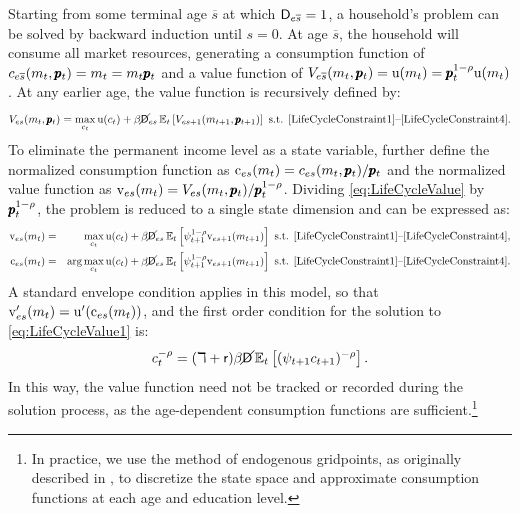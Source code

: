 \documentclass[12pt,titlepage]{econtex}
\begin{document}
Starting from some terminal age $\overline{s}$ at which $\mathsf{D}_{e\overline{s}} = 1$, a household's problem can be solved by backward induction until $s = 0$.  At age $\overline{s}$, the household will consume all market resources, generating a consumption function of $c_{e\overline{s}}(m_t,\pmb{p}_t) = m_t = m_t \pmb{p}_t$ and a value function of $V_{e\overline{s}}(m_t,\pmb{p}_t) = {\mathrm{u}}(m_t) = \pmb{p}_t^{1-\rho} {\mathrm{u}}(m_t)$.  At any earlier age, the value function is recursively defined by:
\begin{equation}
\label{eq:LifeCycleValue}
V_{es}(m_t,\pmb{p}_t) = \max_{c_t} {\mathrm{u}}(c_t) + \beta \cancel{\mathsf{D}}_{es} \operatorname{\mathbb{E}}_t \left[ V_{es+1}(m_{t+1},\pmb{p}_{t+1})\right] \text{ s.t. \eqref{LifeCycleConstraint1}--\eqref{LifeCycleConstraint4}}.
\end{equation}
To eliminate the permanent income level as a state variable, further define the normalized consumption function as $\mathrm{c}_{es}(m_t) = c_{es}(m_t,\pmb{p}_t)/\pmb{p}_t$ and the normalized value function as $\mathrm{v}_{es}(m_t) = V_{es}(m_t,\pmb{p}_t)/\pmb{p}_t^{1-\rho}$.  Dividing \eqref{eq:LifeCycleValue} by $\pmb{p}_t^{1-\rho}$, the problem is reduced to a single state dimension and can be expressed as:
\begin{eqnarray}\label{eq:LifeCycleValue1}
\mathrm{v}_{es}(m_t) &=& \max_{c_t} {\mathrm{u}}(c_t) + \beta \cancel{\mathsf{D}}_{es} \operatorname{\mathbb{E}}_t \left[\psi_{t+1}^{1-\rho} \mathrm{v}_{es+1}(m_{t+1})\right] \text{ s.t. \eqref{LifeCycleConstraint1}--\eqref{LifeCycleConstraint4}},\\
\mathrm{c}_{es}(m_t) &=& \arg\max_{c_t} {\mathrm{u}}(c_t) + \beta \cancel{\mathsf{D}}_{es} \operatorname{\mathbb{E}}_t \left[\psi_{t+1}^{1-\rho} \mathrm{v}_{es+1}(m_{t+1})\right] \text{ s.t. \eqref{LifeCycleConstraint1}--\eqref{LifeCycleConstraint4}}. \nonumber
\end{eqnarray}
A standard envelope condition applies in this model, so that $\mathrm{v}_{es}^{\prime}(m_t) = {\mathrm{u}}^{\prime}(\mathrm{c}_{es}(m_t))$, and the first order condition for the solution to \eqref{eq:LifeCycleValue1} is:
\begin{equation}
c_t^{-\rho} = (\daleth +\mathsf{r}) \beta \cancel{\mathsf{D}} \operatorname{\mathbb{E}}_t \left[ (\psi_{t+1} c_{t+1})^{-\rho} \right].
\end{equation}
In this way, the value function need not be tracked or recorded during the solution process, as the age-dependent consumption functions are sufficient.\footnote{In practice, we use the method of endogenous gridpoints, as originally described in \cite{carrollEGM}, to discretize the state space and approximate consumption functions at each age and education level.}
\end{document}
